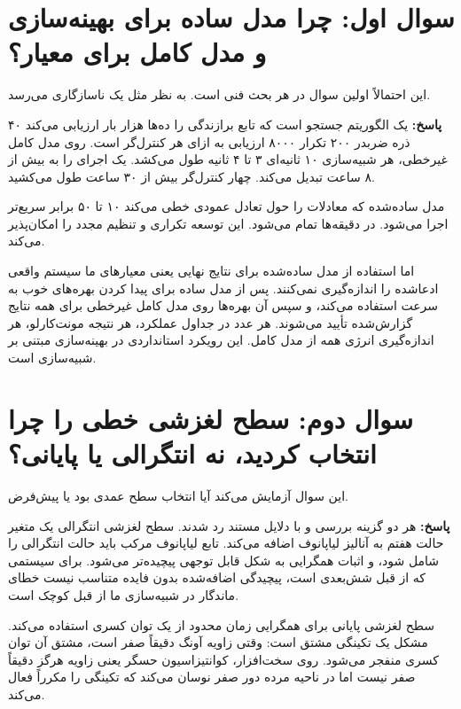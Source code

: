 \documentclass[12pt, a4paper]{article}
\newcommand{\dash}{\lr{---}}
\begin{document}
\section{سوال اول: چرا مدل ساده برای بهينه‌سازی و مدل کامل برای معيار؟}

اين احتمالاً اولين سوال در هر بحث فنی است. به نظر مثل يک ناسازگاری می‌رسد.

\textbf{پاسخ:}  يک الگوريتم جستجو است که تابع برازندگی را ده‌ها هزار بار ارزيابی می‌کند \dash{} ۴۰ ذره ضربدر ۲۰۰ تکرار ۸۰۰۰ ارزيابی به ازای هر کنترل‌گر است. روی مدل کامل غيرخطی، هر شبيه‌سازی ۱۰ ثانيه‌ای ۳ تا ۴ ثانيه طول می‌کشد. يک اجرای  را به بيش از ۸ ساعت تبديل می‌کند. چهار کنترل‌گر بيش از ۳۰ ساعت طول می‌کشيد.

مدل ساده‌شده \dash{} که معادلات را حول تعادل عمودی خطی می‌کند \dash{} ۱۰ تا ۵۰ برابر سريع‌تر اجرا می‌شود.  در دقيقه‌ها تمام می‌شود. اين توسعه تکراری و تنظيم مجدد را امکان‌پذير می‌کند.

اما استفاده از مدل ساده‌شده برای نتايج نهايی يعنی معيارهای ما سيستم واقعی ادعاشده را اندازه‌گيری نمی‌کنند. پس  از مدل ساده برای پيدا کردن بهره‌های خوب به سرعت استفاده می‌کند، و سپس آن بهره‌ها روی مدل کامل غيرخطی برای همه نتايج گزارش‌شده تأييد می‌شوند. هر عدد در جداول عملکرد، هر نتيجه مونت‌کارلو، هر اندازه‌گيری انرژی \dash{} همه از مدل کامل. اين رويکرد استانداردی در بهينه‌سازی مبتنی بر شبيه‌سازی است.

\section{سوال دوم: سطح لغزشی خطی را چرا انتخاب کرديد، نه انتگرالی يا پايانی؟}

اين سوال آزمايش می‌کند آيا انتخاب سطح عمدی بود يا پيش‌فرض.

\textbf{پاسخ:} هر دو گزينه بررسی و با دلايل مستند رد شدند. سطح لغزشی انتگرالی يک متغير حالت هفتم به آناليز لياپانوف اضافه می‌کند. تابع لياپانوف مرکب بايد حالت انتگرالی را شامل شود، و اثبات همگرايی به شکل قابل توجهی پيچيده‌تر می‌شود. برای سيستمی که از قبل شش‌بعدی است، پيچيدگی اضافه‌شده بدون فايده متناسب نيست \dash{} خطای ماندگار در شبيه‌سازی ما از قبل کوچک است.

سطح لغزشی پايانی برای همگرايی زمان محدود از يک توان کسری استفاده می‌کند. مشکل يک تکينگی مشتق است: وقتی زاويه آونگ دقيقاً صفر است، مشتق آن توان کسری منفجر می‌شود. روی سخت‌افزار، کوانتيزاسيون حسگر يعنی زاويه هرگز دقيقاً صفر نيست اما در ناحيه مرده دور صفر نوسان می‌کند \dash{} که تکينگی را مکرراً فعال می‌کند.
\end{document}
